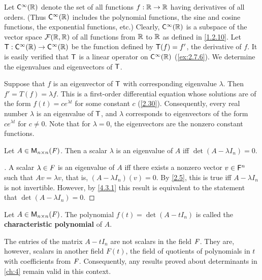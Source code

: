 \begin{eg}\label{5.1.4}
  Let \(\cfs[\infty](\R)\) denote the set of all functions \(f : \mathbb{R} \to \mathbb{R}\) having derivatives of all orders.
  (Thus \(\cfs[\infty](\R)\) includes the polynomial functions, the sine and cosine functions, the exponential functions, etc.)
  Clearly, \(\cfs[\infty](\R)\) is a subspace of the vector space \(\mathcal{F}(\mathbb{R}, \mathbb{R})\) of all functions from \(\mathbb{R}\) to \(\mathbb{R}\) as defined in \cref{1.2.10}.
  Let \(\T : \cfs[\infty](\R) \to \cfs[\infty](\R)\) be the function defined by \(\mathsf{T}(f) = f'\), the derivative of \(f\).
  It is easily verified that \(\mathsf{T}\) is a linear operator on \(\cfs[\infty](\R)\) (\cref{ex:2.7.6}).
  We determine the eigenvalues and eigenvectors of \(\mathsf{T}\).

  Suppose that \(f\) is an eigenvector of \(\mathsf{T}\) with corresponding eigenvalue \(\lambda\).
  Then \(f' = T(f) = \lambda f\).
  This is a first-order differential equation whose solutions are of the form \(f(t) = ce^{\lambda t}\) for some constant \(c\) (\cref{2.30}).
  Consequently, every real number \(\lambda\) is an eigenvalue of \(\mathsf{T}\), and \(\lambda\) corresponds to eigenvectors of the form \(ce^{\lambda t}\) for \(c \neq 0\).
  Note that for \(\lambda = 0\), the eigenvectors are the nonzero constant functions.
\end{eg}

\begin{thm}\label{5.2}
  Let \(A \in \mathsf{M}_{{n} \times n}({\mathit{F}})\).
  Then a scalar \(\lambda\) is an eigenvalue of \(A\) iff \(\det(A - \lambda I_n) = 0\).
\end{thm}

\begin{proof}[]
  A scalar \(\lambda \in \mathit{F}\) is an eigenvalue of \(A\) iff there exists a nonzero vector \(v \in \mathsf{F}^n\) such that \(Av = \lambda v\), that is, \((A - \lambda I_n)(v) = 0\).
  By \cref{2.5}, this is true iff \(A - \lambda I_n\) is not invertible.
  However, by \cref{4.3.1} this result is equivalent to the statement that \(\det(A - \lambda I_n) = 0\).
\end{proof}

\begin{defn}\label{5.1.5}
  Let \(A \in \mathsf{M}_{{n} \times n}({\mathit{F}})\).
  The polynomial \(f(t) = \det(A - t I_n)\) is called the \textbf{characteristic polynomial} of \(A\).
\end{defn}

\begin{note}
  The entries of the matrix \(A - t I_n\) are not scalars in the field \(\mathit{F}\).
  They are, however, scalars in another field \(F(t)\), the field of quotients of polynomials in \(t\) with coefficients from \(\mathit{F}\).
  Consequently, any results proved about determinants in \cref{ch:4} remain valid in this context.
\end{note}

